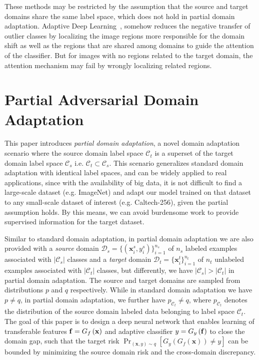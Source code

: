 \documentclass[runningheads]{llncs}
\begin{document}
These methods may be restricted by the assumption that the source and target domains share the same label space, which does not hold in partial domain adaptation. Adaptive Deep Learning~\cite{cite:ICRA18LoAd}, somehow reduces the negative transfer of outlier classes by localizing the image regions more responsible for the domain shift as well as the regions that are shared among domains to guide the attention of the classifier. But for images with no regions related to the target domain, the attention mechanism may fail by wrongly localizing related regions. 

\section{Partial Adversarial Domain Adaptation}
This paper introduces \emph{partial domain adaptation}, a novel domain adaptation scenario where the source domain label space $\mathcal{C}_t$ is a superset of the target domain label space $\mathcal{C}_s$ i.e. $\mathcal{C}_t \subset \mathcal{C}_s$. This scenario generalizes standard domain adaptation with identical label spaces, and can be widely applied to real applications, since with the availability of big data, it is not difficult to find a large-scale dataset (e.g. ImageNet) and adapt our model trained on that dataset to any small-scale dataset of interest (e.g. Caltech-256), given the partial assumption holds. By this means, we can avoid burdensome work to provide supervised information for the target dataset.

Similar to standard domain adaptation, in partial domain adaptation we are also provided with a \emph{source} domain $\mathcal{D}_s = \{(\mathbf{x}_i^s,y^s_i)\}_{i=1}^{n_s}$ of $n_s$ labeled examples associated with $|\mathcal{C}_s|$ classes and a \emph{target} domain ${{\mathcal D}_t} = \{ {\mathbf{x}}_i^t\} _{i = 1}^{{n_t}}$ of $n_t$ unlabeled examples associated with $|\mathcal{C}_t|$ classes, but differently, we have $|\mathcal{C}_s| > |\mathcal{C}_t|$ in partial domain adaptation. The source and target domains are sampled from distributions $p$ and $q$ respectively. While in standard domain adaptation we have $p \ne q$, in partial domain adaptation, we further have $p_{\mathcal{C}_t} \ne q$, where $p_{\mathcal{C}_t}$ denotes the distribution of the source domain labeled data belonging to label space $\mathcal{C}_t$.
The goal of this paper is to design a deep neural network that enables learning of transferable features $\mathbf{f} = G_f\left( {\bf{x}} \right)$ and adaptive classifier $y = G_y\left( {\bf{f}} \right)$ to close the domain gap, such that the target risk ${\Pr _{\left( {{\mathbf{x}},y} \right) \sim q}}\left[ {G_y \left( G_f({\mathbf{x}}) \right) \ne y} \right]$ can be bounded by minimizing the source domain risk and the cross-domain discrepancy.
\end{document}
